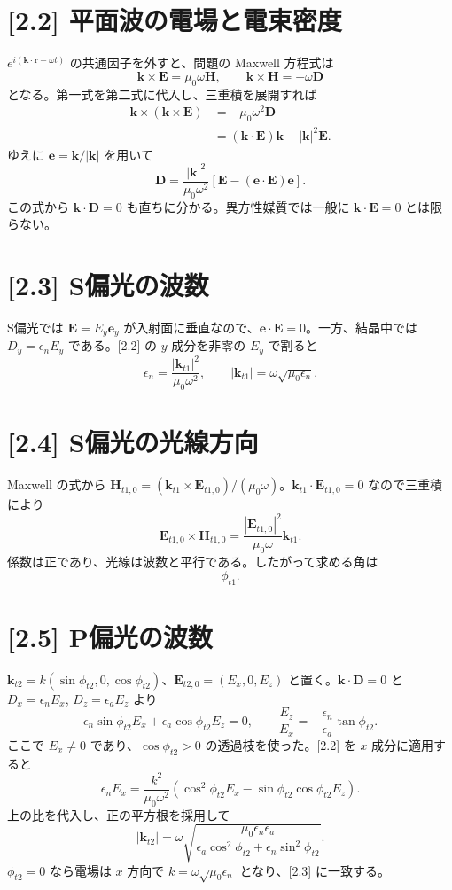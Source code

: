 \documentclass[11pt,a4paper]{article}
\begin{document}
\section*{[2.2] 平面波の電場と電束密度}
$e^{i(\boldsymbol k\cdot\boldsymbol r-\omega t)}$ の共通因子を外すと、問題の Maxwell 方程式は
\[
\boldsymbol k\times\boldsymbol E=\mu_0\omega\boldsymbol H,
\qquad
\boldsymbol k\times\boldsymbol H=-\omega\boldsymbol D
\]
となる。第一式を第二式に代入し、三重積を展開すれば
\begin{align*}
\boldsymbol k\times(\boldsymbol k\times\boldsymbol E)
&=-\mu_0\omega^2\boldsymbol D\\
&=(\boldsymbol k\cdot\boldsymbol E)\boldsymbol k-|\boldsymbol k|^2\boldsymbol E.
\end{align*}
ゆえに $\boldsymbol e=\boldsymbol k/|\boldsymbol k|$ を用いて
\[
\boxed{\boldsymbol D=\frac{|\boldsymbol k|^2}{\mu_0\omega^2}
\left[\boldsymbol E-(\boldsymbol e\cdot\boldsymbol E)\boldsymbol e\right].}
\]
この式から $\boldsymbol k\cdot\boldsymbol D=0$ も直ちに分かる。異方性媒質では一般に $\boldsymbol k\cdot\boldsymbol E=0$ とは限らない。

\section*{[2.3] S偏光の波数}
S偏光では $\boldsymbol E=E_y\boldsymbol e_y$ が入射面に垂直なので、$\boldsymbol e\cdot\boldsymbol E=0$。一方、結晶中では $D_y=\epsilon_nE_y$ である。[2.2] の $y$ 成分を非零の $E_y$ で割ると
\[
\epsilon_n=\frac{|\boldsymbol k_{t1}|^2}{\mu_0\omega^2},
\qquad
\boxed{|\boldsymbol k_{t1}|=\omega\sqrt{\mu_0\epsilon_n}.}
\]

\section*{[2.4] S偏光の光線方向}
Maxwell の式から $\boldsymbol H_{t1,0}=(\boldsymbol k_{t1}\times\boldsymbol E_{t1,0})/(\mu_0\omega)$。$\boldsymbol k_{t1}\cdot\boldsymbol E_{t1,0}=0$ なので三重積により
\[
\boldsymbol E_{t1,0}\times\boldsymbol H_{t1,0}
=\frac{|\boldsymbol E_{t1,0}|^2}{\mu_0\omega}\boldsymbol k_{t1}.
\]
係数は正であり、光線は波数と平行である。したがって求める角は
\[
\boxed{\phi_{t1}.}
\]

\section*{[2.5] P偏光の波数}
$\boldsymbol k_{t2}=k(\sin\phi_{t2},0,\cos\phi_{t2})$、$\boldsymbol E_{t2,0}=(E_x,0,E_z)$ と置く。$\boldsymbol k\cdot\boldsymbol D=0$ と $D_x=\epsilon_nE_x$, $D_z=\epsilon_aE_z$ より
\[
\epsilon_n\sin\phi_{t2}E_x+\epsilon_a\cos\phi_{t2}E_z=0,
\qquad
\frac{E_z}{E_x}=-\frac{\epsilon_n}{\epsilon_a}\tan\phi_{t2}.
\]
ここで $E_x\ne0$ であり、$\cos\phi_{t2}>0$ の透過枝を使った。[2.2] を $x$ 成分に適用すると
\[
\epsilon_nE_x=\frac{k^2}{\mu_0\omega^2}
\left(\cos^2\phi_{t2}E_x-\sin\phi_{t2}\cos\phi_{t2}E_z\right).
\]
上の比を代入し、正の平方根を採用して
\[
\boxed{|\boldsymbol k_{t2}|=\omega\sqrt{\frac{\mu_0\epsilon_n\epsilon_a}
{\epsilon_a\cos^2\phi_{t2}+\epsilon_n\sin^2\phi_{t2}}}.}
\]
$\phi_{t2}=0$ なら電場は $x$ 方向で $k=\omega\sqrt{\mu_0\epsilon_n}$ となり、[2.3] に一致する。
\end{document}
